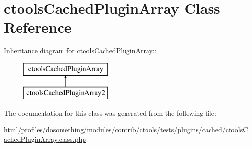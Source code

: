 \hypertarget{classctoolsCachedPluginArray}{
\section{ctoolsCachedPluginArray Class Reference}
\label{classctoolsCachedPluginArray}
}
Inheritance diagram for ctoolsCachedPluginArray::\begin{figure}[H]
\begin{center}
\leavevmode
\includegraphics[height=2cm]{classctoolsCachedPluginArray}
\end{center}
\end{figure}


The documentation for this class was generated from the following file:\begin{DoxyCompactItemize}
\item 
html/profiles/dosomething/modules/contrib/ctools/tests/plugins/cached/\hyperlink{ctoolsCachedPluginArray_8class_8php}{ctoolsCachedPluginArray.class.php}\end{DoxyCompactItemize}
